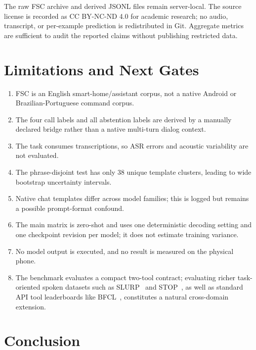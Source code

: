 \documentclass[12pt]{article}
\begin{document}
The raw FSC archive and derived JSONL files remain server-local. The source license is recorded as CC BY-NC-ND 4.0 for academic research; no audio, transcript, or per-example prediction is redistributed in Git. Aggregate metrics are sufficient to audit the reported claims without publishing restricted data.

\section{Limitations and Next Gates}

\begin{enumerate}
\item FSC is an English smart-home/assistant corpus, not a native Android or Brazilian-Portuguese command corpus.
\item The four call labels and all abstention labels are derived by a manually declared bridge rather than a native multi-turn dialog context.
\item The task consumes transcriptions, so ASR errors and acoustic variability are not evaluated.
\item The phrase-disjoint test has only 38 unique template clusters, leading to wide bootstrap uncertainty intervals.
\item Native chat templates differ across model families; this is logged but remains a possible prompt-format confound.
\item The main matrix is zero-shot and uses one deterministic decoding setting and one checkpoint revision per model; it does not estimate training variance.
\item No model output is executed, and no result is measured on the physical phone.
\item The benchmark evaluates a compact two-tool contract; evaluating richer task-oriented spoken datasets such as SLURP~\cite{bastianelli2020slurp} and STOP~\cite{tomasello2023stop}, as well as standard API tool leaderboards like BFCL~\cite{patil2025bfcl}, constitutes a natural cross-domain extension.
\end{enumerate}

\section{Conclusion}
\end{document}
